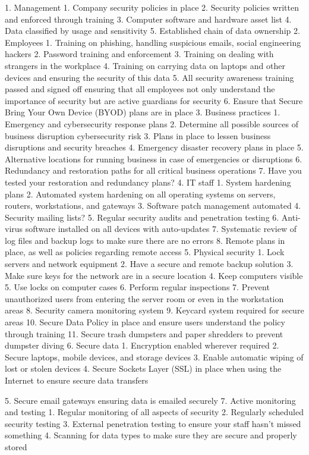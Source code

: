 {1. Management
1. Company security policies in place
2. Security policies written and enforced through training
3. Computer software and hardware asset list
4. Data classified by usage and sensitivity
5. Established chain of data ownership
2. Employees
1. Training on phishing, handling suspicious emails, social engineering hackers
2. Password training and enforcement
3. Training on dealing with strangers in the workplace
4. Training on carrying data on laptops and other devices and ensuring the security
of this data
5. All security awareness training passed and signed off ensuring that all employees
not only understand the importance of security but are active guardians for
security
6. Ensure that Secure Bring Your Own Device (BYOD) plans are in place
3. Business practices
1. Emergency and cybersecurity response plans
2. Determine all possible sources of business disruption cybersecurity risk
3. Plans in place to lessen business disruptions and security breaches
4. Emergency disaster recovery plans in place
5. Alternative locations for running business in case of emergencies or disruptions
6. Redundancy and restoration paths for all critical business operations
7. Have you tested your restoration and redundancy plans?
4. IT staff
1. System hardening plans
2. Automated system hardening on all operating systems on servers, routers,
workstations, and gateways
3. Software patch management automated
4. Security mailing lists?
5. Regular security audits and penetration testing
6. Anti-virus software installed on all devices with auto-updates
7. Systematic review of log files and backup logs to make sure there are no errors
8. Remote plans in place, as well as policies regarding remote access
5. Physical security
1. Lock servers and network equipment
2. Have a secure and remote backup solution
3. Make sure keys for the network are in a secure location
4. Keep computers visible
5. Use locks on computer cases
6. Perform regular inspections
7. Prevent unauthorized users from entering the server room or even in the
workstation areas
8. Security camera monitoring system
9. Keycard system required for secure areas
10. Secure Data Policy in place and ensure users understand the policy through
training
11. Secure trash dumpsters and paper shredders to prevent dumpster diving
6. Secure data
1. Encryption enabled wherever required
2. Secure laptops, mobile devices, and storage devices
3. Enable automatic wiping of lost or stolen devices
4. Secure Sockets Layer (SSL) in place when using the Internet to ensure secure
data transfers

5. Secure email gateways ensuring data is emailed securely
7. Active monitoring and testing
1. Regular monitoring of all aspects of security
2. Regularly scheduled security testing
3. External penetration testing to ensure your staff hasn’t missed something
4. Scanning for data types to make sure they are secure and properly stored

}
